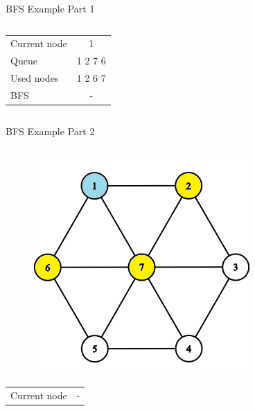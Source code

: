 \documentclass[aspectratio=169]{beamer}%
\begin{document}
\begin{frame}{BFS Example Part 1}
\begin{columns}
\begin{column}{0.32\textwidth}
\begin{figure}[!ht]
            \end{figure}
            \begin{table}[ht]
                \centering
                \begin{tabular}{l c}
                    Current node & 1\\
                    Queue & 1 2 7 6 \\ 
                    Used nodes & 1 2 6 7\\
                    BFS & -
                \end{tabular}
            \end{table}
        \end{column}
    \end{columns}
\end{frame}

\begin{frame}{BFS Example Part 2}
    \begin{columns}
        \begin{column}{0.32\textwidth}
            \begin{figure}[!ht]
                \centering
                \includegraphics[width=0.9\linewidth]{bfs 4.png}
            \end{figure}
            \begin{table}[ht]
                \centering
                \begin{tabular}{l c}
                    Current node & -\\

\end{tabular}
\end{table}
\end{column}
\end{columns}
\end{frame}
\end{document}
